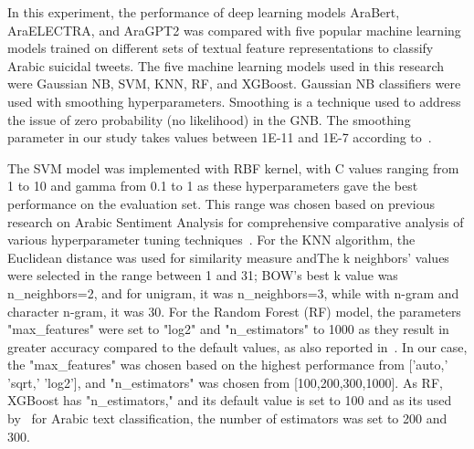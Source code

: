 \documentclass[sn-mathphys,Numbered]{sn-jnl}%
\begin{document}
    In this experiment, the performance of deep learning models AraBert, AraELECTRA, and AraGPT2 was compared with five popular machine learning models trained on different sets of textual feature representations to classify Arabic suicidal tweets. The five machine learning models used in this research were Gaussian NB, SVM, KNN, RF, and XGBoost. Gaussian NB classifiers were used with smoothing hyperparameters. Smoothing is a technique used to address the issue of zero probability (no likelihood) in the GNB. The smoothing parameter in our study takes values between 1E-11 and 1E-7 according to~\cite{john2013estimating,informatics8040079}. %

The SVM model was implemented with RBF kernel, with C values ranging from 1 to 10 and gamma from 0.1 to 1 as these hyperparameters gave the best performance on the evaluation set. This range was chosen based on previous research on Arabic Sentiment Analysis for comprehensive comparative analysis of various hyperparameter tuning techniques~\cite{informatics8040079}. 
For the KNN algorithm, the Euclidean distance was used for similarity measure andThe k neighbors’ values were selected in the range between 1 and 31; BOW’s best k value was n\_neighbors=2, and for unigram, it was n\_neighbors=3, while with n-gram and character n-gram, it was 30. For the Random Forest (RF) model, the parameters "max\_features" were set to "log2" and "n\_estimators" to 1000 as they result in greater accuracy compared to the default values, as also reported in~\cite{informatics8040079}. %
In our case, the "max\_features" was chosen based on the highest performance from ['auto,' 'sqrt,' 'log2'], and "n\_estimators" was chosen from [100,200,300,1000]. 
As RF, XGBoost has "n\_estimators," and its default value is set to 100 and as its used by~\cite{AMOUDI202212511} %
for Arabic text classification, the number of estimators was set to 200 and 300. %
\end{document}
